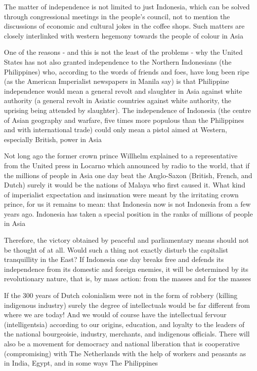 The matter of independence is not limited to just Indonesia, which can be solved through congressional meetings 
in the people's council, not to mention the discussions of economic and cultural jokes in the coffee shops. 
Such matters are closely interlinked with western hegemony towards the people of colour in Asia\vskip 0.2in

One of the reasons - and this is not the least of the problems - why the United States has not also granted independence 
to the Northern Indonesians (the Philippines) who, according to the words of friends and foes, have long been ripe 
(as the American Imperialist newspapers in Manila say) is that Philippine independence would mean a general revolt and slaughter in 
Asia against white authority (a general revolt in Asiatic countries against white authority, the uprising being attended by slaughter). 
The independence of Indonesia (the centre of Asian geography and warfare, five times more populous than the Philippines 
and with international trade) could only mean a pistol aimed at Western, especially British, power in Asia\vskip 0.2in

Not long ago the former crown prince Willhelm explained to a representative from the United press 
in Locarno which announced by radio to the world, that if the millions of people in Asia one day beat 
the Anglo-Saxon (British, French, and Dutch) surely it would be the nations of Malaya who first caused it. 
What kind of imperialist expectation and insinuation were meant by the irritating crown prince, for us 
it remains to mean: that Indonesia now is not Indonesia from a few years ago. Indonesia has taken a special 
position in the ranks of millions of people in Asia\vskip 0.2in

Therefore, the victory obtained by peaceful and parliamentary means should not be thought of at all. 
Would such a thing not exactly disturb the capitalist tranquillity in the East? If Indonesia one day 
breaks free and defends its independence from its domestic and foreign enemies, it will be determined by its 
revolutionary nature, that is, by mass action: from the masses and for the masses\vskip 0.2in

If the 300 years of Dutch colonialism were not in the form of robbery (killing indigenous industry) surely 
the degree of intellectuals would be far different from where we are today! And we would of course have 
the intellectual fervour (intelligentsia) according to our origins, education, and loyalty to the leaders 
of the national bourgeoisie, industry, merchants, and indigenous officials. There will also be a movement 
for democracy and national liberation that is cooperative (compromising) with The Netherlands 
with the help of workers and peasants as in India, Egypt, and in some ways The Philippines\vskip 0.2in

